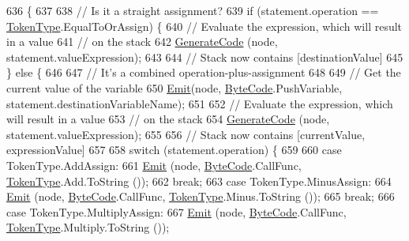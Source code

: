 \begin{DoxyCode}
636                                                                            \{
637 
638             \textcolor{comment}{// Is it a straight assignment?}
639             \textcolor{keywordflow}{if} (statement.operation == \hyperlink{a00031_a301aa7c866593a5b625a8fc158bbeace}{TokenType}.EqualToOrAssign) \{
640                 \textcolor{comment}{// Evaluate the expression, which will result in a value}
641                 \textcolor{comment}{// on the stack}
642                 \hyperlink{a00034_a006f3becd521cc179ba3d3352f6f930b}{GenerateCode} (node, statement.valueExpression);
643 
644                 \textcolor{comment}{// Stack now contains [destinationValue]}
645             \} \textcolor{keywordflow}{else} \{
646 
647                 \textcolor{comment}{// It's a combined operation-plus-assignment}
648 
649                 \textcolor{comment}{// Get the current value of the variable}
650                 \hyperlink{a00034_a774e8c143cdda0584fcfdda98626a83c}{Emit}(node, \hyperlink{a00031_ad5dfb6ee68ca7469623ad3e459f98894}{ByteCode}.PushVariable, statement.destinationVariableName);
651 
652                 \textcolor{comment}{// Evaluate the expression, which will result in a value}
653                 \textcolor{comment}{// on the stack}
654                 \hyperlink{a00034_a006f3becd521cc179ba3d3352f6f930b}{GenerateCode} (node, statement.valueExpression);
655 
656                 \textcolor{comment}{// Stack now contains [currentValue, expressionValue]}
657 
658                 \textcolor{keywordflow}{switch} (statement.operation) \{
659 
660                 \textcolor{keywordflow}{case} TokenType.AddAssign:
661                     \hyperlink{a00034_a774e8c143cdda0584fcfdda98626a83c}{Emit} (node, \hyperlink{a00031_ad5dfb6ee68ca7469623ad3e459f98894}{ByteCode}.CallFunc, \hyperlink{a00031_a301aa7c866593a5b625a8fc158bbeace}{TokenType}.Add.ToString ());
662                     \textcolor{keywordflow}{break};
663                 \textcolor{keywordflow}{case} TokenType.MinusAssign:
664                     \hyperlink{a00034_a774e8c143cdda0584fcfdda98626a83c}{Emit} (node, \hyperlink{a00031_ad5dfb6ee68ca7469623ad3e459f98894}{ByteCode}.CallFunc, \hyperlink{a00031_a301aa7c866593a5b625a8fc158bbeace}{TokenType}.Minus.ToString ());
665                     \textcolor{keywordflow}{break};
666                 \textcolor{keywordflow}{case} TokenType.MultiplyAssign:
667                     \hyperlink{a00034_a774e8c143cdda0584fcfdda98626a83c}{Emit} (node, \hyperlink{a00031_ad5dfb6ee68ca7469623ad3e459f98894}{ByteCode}.CallFunc, \hyperlink{a00031_a301aa7c866593a5b625a8fc158bbeace}{TokenType}.Multiply.ToString ());

\end{DoxyCode}
